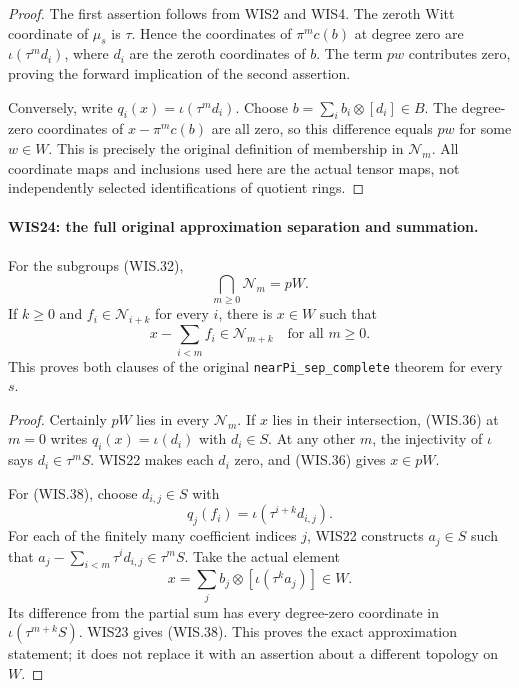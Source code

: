 \documentclass[11pt,a4paper]{article}
\numberwithin{equation}{section}
\theoremstyle{remark}\newtheorem{remark}[theorem]{Remark}
\begin{document}
\begin{proof}
The first assertion follows from WIS2 and WIS4.
The zeroth Witt coordinate of $\mu_s$ is $\tau$.
Hence the coordinates of $\pi^mc(b)$ at degree zero
are $\iota(\tau^m d_i)$, where $d_i$ are the zeroth
coordinates of $b$. The term $pw$ contributes zero,
proving the forward implication of the second assertion.

Conversely, write $q_i(x)=\iota(\tau^m d_i)$.
Choose $b=\sum_i b_i\otimes[d_i]\in B$.
The degree-zero coordinates of $x-\pi^mc(b)$
are all zero, so this difference equals $pw$
for some $w\in W$. This is precisely the original
definition of membership in $\mathcal N_m$.
All coordinate maps and inclusions used here are
the actual tensor maps, not independently selected
identifications of quotient rings.
\end{proof}

\paragraph{WIS24: the full original approximation separation and summation.}
\label{claim:WIS24}
For the subgroups (WIS.32),
\[
       \bigcap_{m\geq0}\mathcal N_m=pW.                    \tag{WIS.37}
\]
If $k\geq0$ and $f_i\in\mathcal N_{i+k}$ for every $i$,
there is $x\in W$ such that
\[
                      x-\sum_{i<m}f_i\in\mathcal N_{m+k}
                          \quad\text{for all }m\geq0.     \tag{WIS.38}
\]
This proves both clauses of the original
\texttt{near\allowbreak Pi\_\allowbreak sep\_\allowbreak complete} theorem for every $s$.

\begin{proof}
Certainly $pW$ lies in every $\mathcal N_m$.
If $x$ lies in their intersection, (WIS.36) at $m=0$
writes $q_i(x)=\iota(d_i)$ with $d_i\in S$.
At any other $m$, the injectivity of $\iota$ says
$d_i\in\tau^mS$. WIS22 makes each $d_i$ zero,
and (WIS.36) gives $x\in pW$.

For (WIS.38), choose $d_{i,j}\in S$ with
\[
                         q_j(f_i)=\iota(\tau^{i+k}d_{i,j}).
\]
For each of the finitely many coefficient indices $j$,
WIS22 constructs $a_j\in S$ such that
$a_j-\sum_{i<m}\tau^id_{i,j}\in\tau^mS$.
Take the actual element
\[
                      x=\sum_j b_j\otimes[\iota(\tau^k a_j)]
                               \in W.
 \tag{WIS.39}
\]
Its difference from the partial sum has every
degree-zero coordinate in $\iota(\tau^{m+k}S)$.
WIS23 gives (WIS.38). This proves the exact
approximation statement; it does not replace it
with an assertion about a different topology on $W$.
\end{proof}
\end{document}
